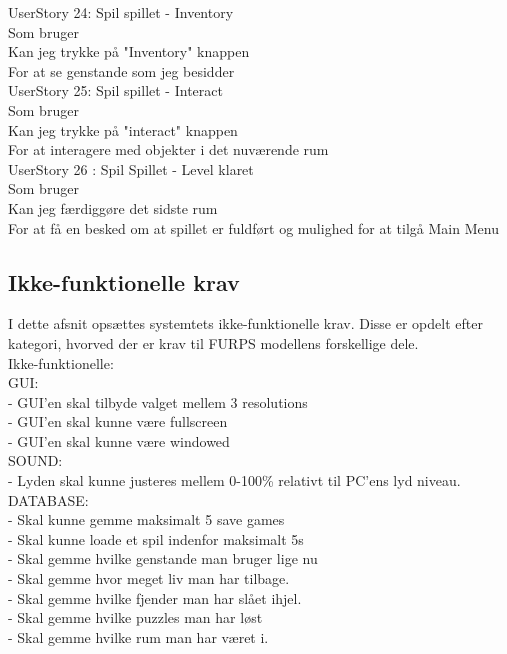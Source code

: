 UserStory 24: Spil spillet - Inventory\\
  Som bruger\\
  Kan jeg trykke på "Inventory" knappen\\
  For at se genstande som jeg besidder\\
  
UserStory 25: Spil spillet - Interact\\
  Som bruger\\
  Kan jeg trykke på "interact" knappen\\
  For at interagere med objekter i det nuværende rum\\
  
UserStory 26 : Spil Spillet - Level klaret\\
  Som bruger\\
  Kan jeg færdiggøre det sidste rum\\
  For at få en besked om at spillet er fuldført og mulighed for at tilgå Main Menu\\

\subsection{Ikke-funktionelle krav}
I dette afsnit opsættes systemtets ikke-funktionelle krav. Disse er opdelt efter kategori, hvorved der er krav til FURPS modellens forskellige dele.\\
Ikke-funktionelle:\\
  GUI:\\
    - GUI'en skal tilbyde valget mellem 3 resolutions\\
    - GUI'en skal kunne være fullscreen\\
    - GUI'en skal kunne være windowed\\

  SOUND:\\
    - Lyden skal kunne justeres mellem 0-100\% relativt til PC'ens lyd niveau.\\

  DATABASE:\\
    - Skal kunne gemme maksimalt 5 save games\\
    - Skal kunne loade et spil indenfor maksimalt 5s\\
    - Skal gemme hvilke genstande man bruger lige nu\\
    - Skal gemme hvor meget liv man har tilbage.\\
    - Skal gemme hvilke fjender man har slået ihjel.\\
    - Skal gemme hvilke puzzles man har løst\\
    - Skal gemme hvilke rum man har været i.\\
    
